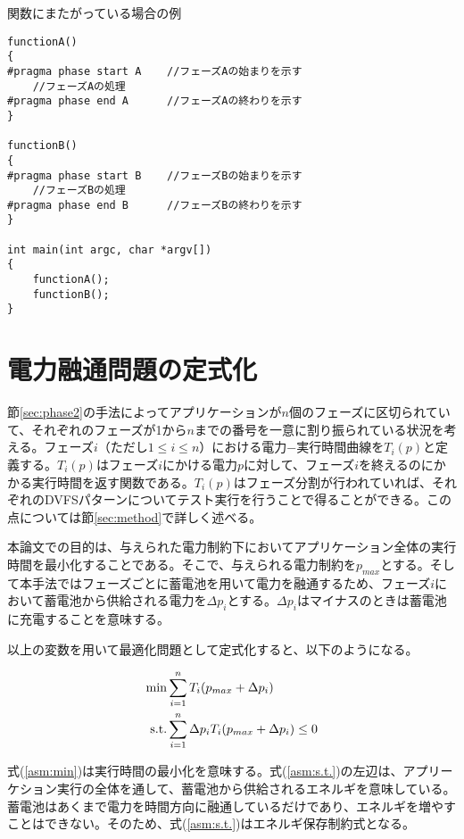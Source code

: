 {\small
\begin{itembox}[c]{関数にまたがっている場合の例}
\begin{verbatim}
functionA()
{
#pragma phase start A    //フェーズAの始まりを示す
    //フェーズAの処理
#pragma phase end A      //フェーズAの終わりを示す
}

functionB()
{
#pragma phase start B    //フェーズBの始まりを示す
    //フェーズBの処理
#pragma phase end B      //フェーズBの終わりを示す
}

int main(int argc, char *argv[])
{
    functionA();
    functionB();
}
\end{verbatim}
\end{itembox}}


\section{電力融通問題の定式化}
\label{sec:formularization}

節\ref{sec:phase2}の手法によってアプリケーションが$n$個のフェーズに区切られていて、それぞれのフェーズが1から$n$までの番号を一意に割り振られている状況を考える。フェーズ$i$（ただし$1\leq i\leq n$）における電力−実行時間曲線を$T_i(p)$と定義する。$T_i(p)$はフェーズ$i$にかける電力$p$に対して、フェーズ$i$を終えるのにかかる実行時間を返す関数である。$T_i(p)$はフェーズ分割が行われていれば、それぞれのDVFSパターンについてテスト実行を行うことで得ることができる。この点については節\ref{sec:method}で詳しく述べる。

本論文での目的は、与えられた電力制約下においてアプリケーション全体の実行時間を最小化することである。そこで、与えられる電力制約を$p_{max}$とする。そして本手法ではフェーズごとに蓄電池を用いて電力を融通するため、フェーズ$i$において蓄電池から供給される電力を$\Delta p_i$とする。$\Delta p_i$はマイナスのときは蓄電池に充電することを意味する。

以上の変数を用いて最適化問題として定式化すると、以下のようになる。

\begin{eqnarray}
{\rm min } & \sum_{i=1}^n T_i(p_{max} + \Delta p_i) \label{asm:min} \\
{\rm s.t. } & \sum_{i=1}^n \Delta p_i T_i(p_{max} + \Delta p_i) \leq 0 \label{asm:s.t.}
\end{eqnarray}

式(\ref{asm:min})は実行時間の最小化を意味する。式(\ref{asm:s.t.})の左辺は、アプリーケション実行の全体を通して、蓄電池から供給されるエネルギを意味している。蓄電池はあくまで電力を時間方向に融通しているだけであり、エネルギを増やすことはできない。そのため、式(\ref{asm:s.t.})はエネルギ保存制約式となる。

